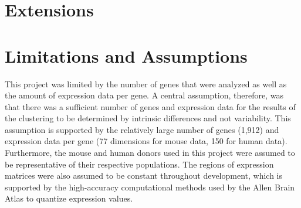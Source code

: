 \documentclass[12pt,oneside,onecolumn,a4paper]{article}
\begin{document}
\section{Extensions}




\appendix

\section{Limitations and Assumptions}

This project was limited by the number of genes that were analyzed as well as the amount of expression data per gene. A central assumption, therefore, was that there was a sufficient number of genes and expression data for the results of the clustering to be determined by intrinsic differences and not variability. This assumption is supported by the relatively large number of genes (1,912) and expression data per gene (77 dimensions for mouse data, 150 for human data). Furthermore, the mouse and human donors used in this project were assumed to be representative of their respective populations. The regions of expression matrices were also assumed to be constant throughout development, which is supported by the high-accuracy computational methods used by the Allen Brain Atlas to quantize expression values.
\end{document}
